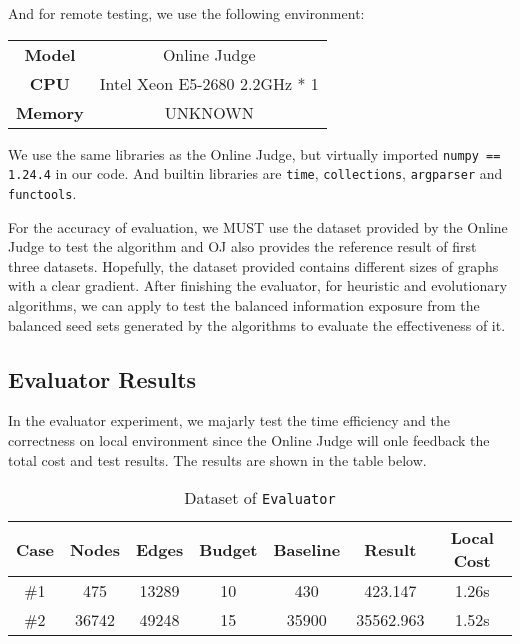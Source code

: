 \documentclass{article}
\begin{document}
And for remote testing, we use the following environment:

\begin{table}[!htbp]
    \begin{center}
    \begin{tabular}[c]{cc}
        \textbf{Model} & Online Judge \\
        \textbf{CPU} & Intel Xeon E5-2680 2.2GHz * 1 \\
        \textbf{Memory} & UNKNOWN
    \end{tabular}
    \end{center}
\end{table}

We use the same libraries as the Online Judge, but virtually imported \texttt{numpy == 1.24.4} in our code. And builtin libraries are \texttt{time}, \texttt{collections}, \texttt{argparser} and \texttt{functools}.

For the accuracy of evaluation, we MUST use the dataset provided by the Online Judge to test the algorithm and OJ also provides the reference result of first three datasets. Hopefully, the dataset provided contains different sizes of graphs with a clear gradient. After finishing the evaluator, for heuristic and evolutionary algorithms, we can apply to test the balanced information exposure from the balanced seed sets generated by the algorithms to evaluate the effectiveness of it.

\subsection{Evaluator Results}

In the evaluator experiment, we majarly test the time efficiency and the correctness on local environment since the Online Judge will onle feedback the total cost and test results. The results are shown in the table below.

\begin{table}[!htbp]
\setlength{\abovecaptionskip}{+0.2cm}
\setlength{\belowcaptionskip}{+0.2cm}
\centering
\caption{Dataset of \texttt{Evaluator}}
\begin{tabular}{ccccccc}
\toprule
\textbf{Case} & \textbf{Nodes} & \textbf{Edges} & \textbf{Budget} & \textbf{Baseline} & \textbf{Result} & \textbf{Local Cost} \\ 
\midrule
    \#1 & 475 & 13289 & 10 & 430 & 423.147 & 1.26s \\
    \#2 & 36742 & 49248 & 15 & 35900 & 35562.963 & 1.52s \\
\bottomrule
\end{tabular}
\end{table}
\end{document}
